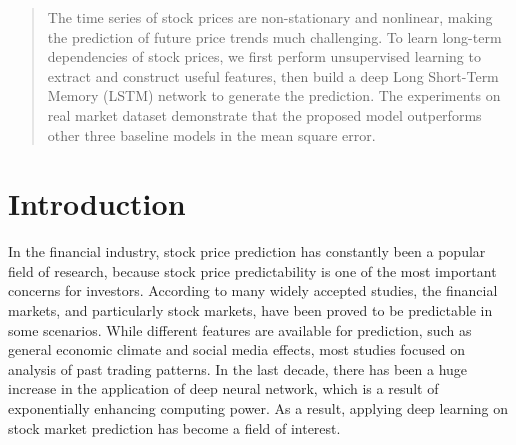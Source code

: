 \documentclass{article}
\begin{document}
 


\begin{abstract} 
The time series of stock prices are non-stationary and nonlinear, making the prediction of future price trends much challenging. To learn long-term dependencies of stock prices, we first perform unsupervised learning to extract and construct useful features, then build a deep Long Short-Term Memory (LSTM) network to generate the prediction. The experiments on real market dataset demonstrate that the proposed model outperforms other three baseline models in the mean square error.
\end{abstract} 

\section{Introduction}

In the financial industry, stock price prediction has constantly been a popular field of research, because stock price predictability is one of the most important concerns for investors. According to many widely accepted studies, the financial markets, and particularly stock markets, have been proved to be predictable in some scenarios. While different features are available for prediction, such as general economic climate and social media effects, most studies focused on analysis of past trading patterns. In the last decade, there has been a huge increase in the application of deep neural network, which is a result of exponentially enhancing computing power. As a result, applying deep learning on stock market prediction has become a field of interest.
\end{document}
